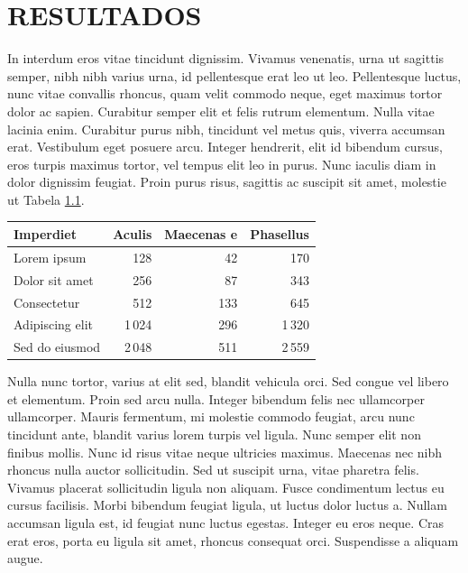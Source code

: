 \chapter{RESULTADOS}
\label{cap:resultados}

In interdum eros vitae tincidunt dignissim. Vivamus venenatis, urna ut sagittis semper, nibh nibh varius urna, id pellentesque erat leo ut leo. Pellentesque luctus, nunc vitae convallis rhoncus, quam velit commodo neque, eget maximus tortor dolor ac sapien. Curabitur semper elit et felis rutrum elementum. Nulla vitae lacinia enim. Curabitur purus nibh, tincidunt vel metus quis, viverra accumsan erat. Vestibulum eget posuere arcu. Integer hendrerit, elit id bibendum cursus, eros turpis maximus tortor, vel tempus elit leo in purus. Nunc iaculis diam in dolor dignissim feugiat. Proin purus risus, sagittis ac suscipit sit amet, molestie ut Tabela \ref{tab:valores}.

\begin{table}[H]
  \label{tab:valores}
  \centering
  \small
  \setlength{\abovetopsep}{3pt}
  \setlength{\aboverulesep}{3pt}
  \begin{tabular}{lrrr}
    \toprule
     Imperdiet         & Aculis  & Maecenas e & Phasellus \\
    \midrule
    Lorem ipsum       & 128      & 42          & 170   \\
    Dolor sit amet    & 256      & 87          & 343   \\
    Consectetur       & 512      & 133         & 645   \\
    Adipiscing elit   & 1\,024   & 296         & 1\,320 \\
    Sed do eiusmod    & 2\,048   & 511         & 2\,559 \\
    \bottomrule
  \end{tabular}
\end{table}

Nulla nunc tortor, varius at elit sed, blandit vehicula orci. Sed congue vel libero et elementum. Proin sed arcu nulla. Integer bibendum felis nec ullamcorper ullamcorper. Mauris fermentum, mi molestie commodo feugiat, arcu nunc tincidunt ante, blandit varius lorem turpis vel ligula. Nunc semper elit non finibus mollis. Nunc id risus vitae neque ultricies maximus. Maecenas nec nibh rhoncus nulla auctor sollicitudin. Sed ut suscipit urna, vitae pharetra felis. Vivamus placerat sollicitudin ligula non aliquam. Fusce condimentum lectus eu cursus facilisis. Morbi bibendum feugiat ligula, ut luctus dolor luctus a. Nullam accumsan ligula est, id feugiat nunc luctus egestas. Integer eu eros neque. Cras erat eros, porta eu ligula sit amet, rhoncus consequat orci. Suspendisse a aliquam augue.

